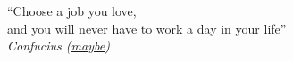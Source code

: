 
\begin{dedication}


\begin{center}
	\thispagestyle{empty}
	\vspace*{\fill}
		\begin{flushright}
		``Choose a job you love,\\
		and you will never have to work a day in your life'' \\
		\textit{Confucius (\href{https://quoteinvestigator.com/2014/09/02/job-love/}{maybe})}
		
		\end{flushright}
	\vspace*{\fill}
\end{center}

 

\end{dedication}


